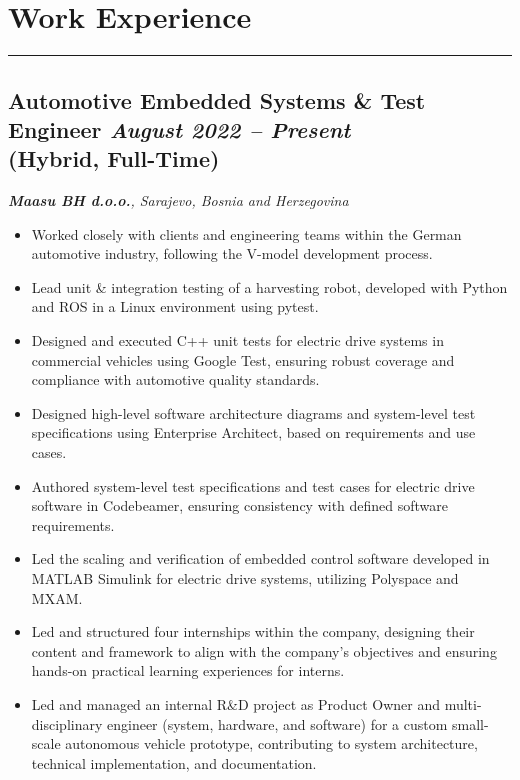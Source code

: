 \section*{Work Experience}
\vspace{-5pt} 
\noindent\rule{\textwidth}{0.4pt} %

\subsection*{\textbf{Automotive Embedded Systems \& Test Engineer} \hfill \textit{August 2022 -- Present}\\ (Hybrid, Full-Time)}  
\noindent\textit{\textbf{Maasu BH d.o.o.}, Sarajevo, Bosnia and Herzegovina} 
\begin{itemize}[leftmargin=*,noitemsep,topsep=3pt]
    \item Worked closely with clients and engineering teams within the German automotive industry, following the V-model development process.
    \item Lead unit \& integration testing of a harvesting robot, developed with Python and ROS in a Linux environment using pytest.
    \item Designed and executed C++ unit tests for electric drive systems in commercial vehicles using Google Test, ensuring robust coverage and compliance with automotive quality standards.
    \item Designed high-level software architecture diagrams and system-level test specifications using Enterprise Architect, based on requirements and use cases.
    \item Authored system-level test specifications and test cases for electric drive software in Codebeamer, ensuring consistency with defined software requirements.
    \item Led the scaling and verification of embedded control software developed in MATLAB Simulink for electric drive systems, utilizing Polyspace and MXAM.
    \item Led and structured four internships within the company, designing their content and framework to align with the company's objectives and ensuring hands-on practical learning experiences for interns.
    \item Led and managed an internal R\&D project as Product Owner and multi-disciplinary engineer (system, hardware, and software) for a custom small-scale autonomous vehicle prototype, contributing to system architecture, technical implementation, and documentation.

\end{itemize}
